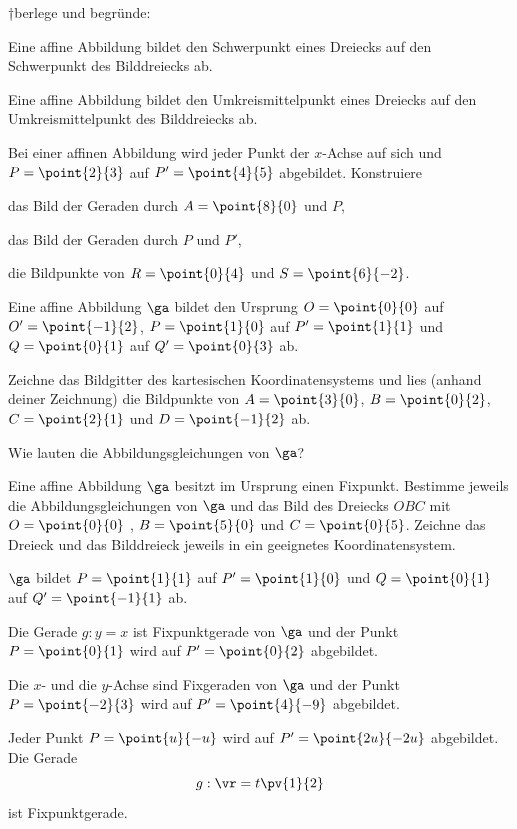 \documentclass[%
11pt,%
twoside,%
titlepage,%
german,%
headsepline%
]{scrartcl}
\begin{document}
\begin{ueb}
†berlege und begründe:
\begin{enumeratea}
\item Eine affine Abbildung bildet den Schwerpunkt eines Dreiecks auf den Schwerpunkt des Bilddreiecks ab.
\item Eine affine Abbildung bildet den Umkreismittelpunkt eines Dreiecks auf den Umkreismittelpunkt des Bilddreiecks ab.
\end{enumeratea}

\end{ueb}

\begin{ueb}
Bei einer affinen Abbildung wird jeder Punkt der $x$-Achse auf sich und $P=\point{2}{3}$ auf $P'=\point{4}{5}$ abgebildet. Konstruiere
\begin{enumeratea}
\item das Bild der Geraden durch $A=\point{8}{0}$ und $P$,
\item das Bild der Geraden durch $P$ und $P'$,
\item die Bildpunkte von $R=\point{0}{4}$ und $S=\point{6}{-2}$.
\end{enumeratea}
\end{ueb}

\begin{ueb}
Eine affine Abbildung $\ga$ bildet den Ursprung $O=\point{0}{0}$ auf $O'=\point{-1}{2}$, $P =\point{1}{0}$ auf
$P'=\point{1}{1}$ und $Q=\point{0}{1}$ auf $Q'=\point{0}{3}$ ab.
\begin{enumeratea}
\item Zeichne das Bildgitter des kartesischen Koordinatensystems und lies (anhand deiner
Zeichnung) die Bildpunkte von $A=\point{3}{0}$, $B=\point{0}{2}$, $C=\point{2}{1}$ und $D=\point{-1}{2}$ ab.
\item Wie lauten die Abbildungsgleichungen von $\ga$?
\end{enumeratea}
\end{ueb}

\begin{ueb}
Eine affine Abbildung $\ga$ besitzt im Ursprung einen Fixpunkt. Bestimme jeweils die Abbildungsgleichungen von $\ga$ und das Bild des Dreiecks $OBC$ mit $O = \point{0}{0}$ , $B = \point{5}{0}$ und $C = \point{0}{5}$. Zeichne das Dreieck und das Bilddreieck jeweils in ein geeignetes Koordinatensystem.
\begin{enumeratea}
\item $\ga$ bildet $P =\point{1}{1}$ auf $P' =\point{1}{0}$ und $Q=\point{0}{1}$ auf $Q' =\point{-1}{1}$ ab.
\item Die Gerade $g : y = x$ ist Fixpunktgerade von $\ga$ und der Punkt $P = \point{0}{1}$ wird auf $P'=\point{0}{2}$ abgebildet.
\item Die $x$- und die $y$-Achse sind Fixgeraden von $\ga$ und der Punkt $P = \point{-2}{3}$ wird auf $P'=\point{4}{-9}$ abgebildet.
\item Jeder Punkt $P = \point{u}{-u}$ wird auf $P' = \point{2u}{-2u}$ abgebildet. Die Gerade
$$g :\vr = t\pv{1}{2}$$
ist Fixpunktgerade.
\end{enumeratea}
\end{ueb}
\end{document}
